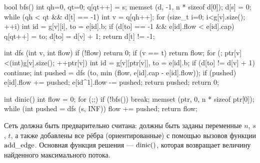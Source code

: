 bool bfs() {
	int qh=0, qt=0;
	q[qt++] = s;
	memset (d, -1, n * sizeof d[0]);
	d[s] = 0;
	while (qh < qt && d[t] == -1) {
		int v = q[qh++];
		for (size_t i=0; i<g[v].size(); ++i) {
			int id = g[v][i],
				to = e[id].b;
			if (d[to] == -1 && e[id].flow < e[id].cap) {
				q[qt++] = to;
				d[to] = d[v] + 1;
			}
		}
	}
	return d[t] != -1;
}

int dfs (int v, int flow) {
	if (!flow)  return 0;
	if (v == t)  return flow;
	for (; ptr[v]<(int)g[v].size(); ++ptr[v]) {
		int id = g[v][ptr[v]],
			to = e[id].b;
		if (d[to] != d[v] + 1)  continue;
		int pushed = dfs (to, min (flow, e[id].cap - e[id].flow));
		if (pushed) {
			e[id].flow += pushed;
			e[id^1].flow -= pushed;
			return pushed;
		}
	}
	return 0;
}

int dinic() {
	int flow = 0;
	for (;;) {
		if (!bfs())  break;
		memset (ptr, 0, n * sizeof ptr[0]);
		while (int pushed = dfs (s, INF))
			flow += pushed;
	}
	return flow;
}
\endcode

Сеть должна быть предварительно считана: должны быть заданы переменные $n$, $s$, $t$, а также добавлены все рёбра (ориентированные) с помощью вызовов функции $\rm add\_edge$. Основная функция решения --- $\rm dinic()$, которая возвращает величину найденного максимального потока.


